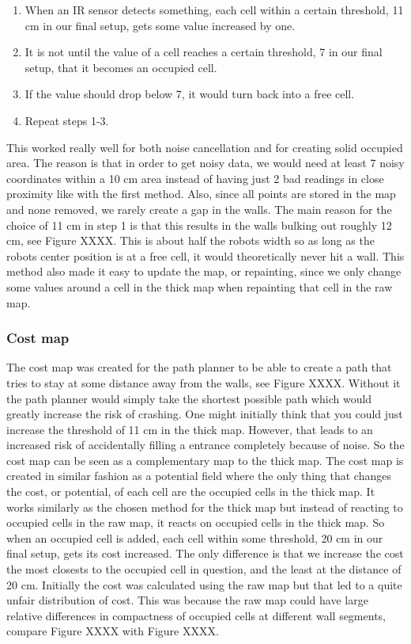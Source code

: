 \begin{enumerate}
\item When an IR sensor detects something, each cell within a certain threshold, 11 cm in our final setup, gets some value increased by one. 
\item It is not until the value of a cell reaches a certain threshold, 7 in our final setup, that it becomes an occupied cell. 
\item If the value should drop below 7, it would turn back into a free cell.
\item Repeat steps 1-3. 
\end{enumerate}

This worked really well for both noise cancellation and for creating solid occupied area. The reason is that in order to get noisy data, we would need at least 7 noisy coordinates within a 10 cm area instead of having just 2 bad readings in close proximity like with the first method. Also, since all points are stored in the map and none removed, we rarely create a gap in the walls. The main reason for the choice of 11 cm in step 1 is that this results in the walls bulking out roughly 12 cm, see Figure XXXX. This is about half the robots width so as long as the robots center position is at a free cell, it would theoretically never hit a wall. This method also made it easy to update the map, or repainting, since we only change some values around a cell in the thick map when repainting that cell in the raw map.

\subsubsection{Cost map}
The cost map was created for the path planner to be able to create a path that tries to stay at some distance away from the walls, see Figure XXXX. Without it the path planner would simply take the shortest possible path which would greatly increase the risk of crashing. One might initially think that you could just increase the threshold of 11 cm in the thick map. However, that leads to an increased risk of accidentally filling a entrance completely because of noise. So the cost map can be seen as a complementary map to the thick map. The cost map is created in similar fashion as a potential field where the only thing that changes the cost, or potential, of each cell are the occupied cells in the thick map. It works similarly as the chosen method for the thick map but instead of reacting to occupied cells in the raw map, it reacts on occupied cells in the thick map. So when an occupied cell is added, each cell within some threshold, 20 cm in our final setup, gets its cost increased. The only difference is that we increase the cost the most closests to the occupied cell in question, and the least at the distance of 20 cm. Initially the cost was calculated using the raw map but that led to a quite unfair distribution of cost. This was because the raw map could have large relative differences in compactness of occupied cells at different wall segments, compare Figure XXXX with Figure XXXX. 

